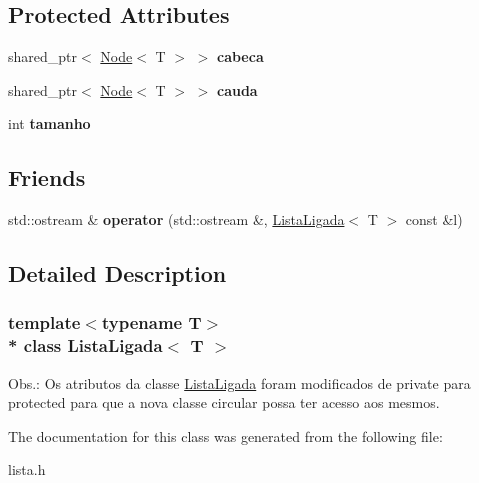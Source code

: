 \subsection*{Protected Attributes}
\begin{DoxyCompactItemize}
\item 
shared\+\_\+ptr$<$ \hyperlink{classNode}{Node}$<$ T $>$ $>$ {\bfseries cabeca}\hypertarget{classListaLigada_a8923b88a26191809b8ffc8181dc20359}{}\label{classListaLigada_a8923b88a26191809b8ffc8181dc20359}

\item 
shared\+\_\+ptr$<$ \hyperlink{classNode}{Node}$<$ T $>$ $>$ {\bfseries cauda}\hypertarget{classListaLigada_a7fbadfbdd19c26712c4f1045a7782804}{}\label{classListaLigada_a7fbadfbdd19c26712c4f1045a7782804}

\item 
int {\bfseries tamanho}\hypertarget{classListaLigada_a7cb56d42e0603821e0b8f8645ec55ba0}{}\label{classListaLigada_a7cb56d42e0603821e0b8f8645ec55ba0}

\end{DoxyCompactItemize}
\subsection*{Friends}
\begin{DoxyCompactItemize}
\item 
std\+::ostream \& {\bfseries operator} (std\+::ostream \&, \hyperlink{classListaLigada}{Lista\+Ligada}$<$ T $>$ const \&l)\hypertarget{classListaLigada_a39cff4b79a3afa0ae93c15e24359f04c}{}\label{classListaLigada_a39cff4b79a3afa0ae93c15e24359f04c}

\end{DoxyCompactItemize}


\subsection{Detailed Description}
\subsubsection*{template$<$typename T$>$\\*
class Lista\+Ligada$<$ T $>$}

Obs.\+: Os atributos da classe \hyperlink{classListaLigada}{Lista\+Ligada} foram modificados de \textquotesingle{}private\textquotesingle{} para \textquotesingle{}protected\textquotesingle{} para que a nova classe \textquotesingle{}circular\textquotesingle{} possa ter acesso aos mesmos. 

The documentation for this class was generated from the following file\+:\begin{DoxyCompactItemize}
\item 
lista.\+h\end{DoxyCompactItemize}
